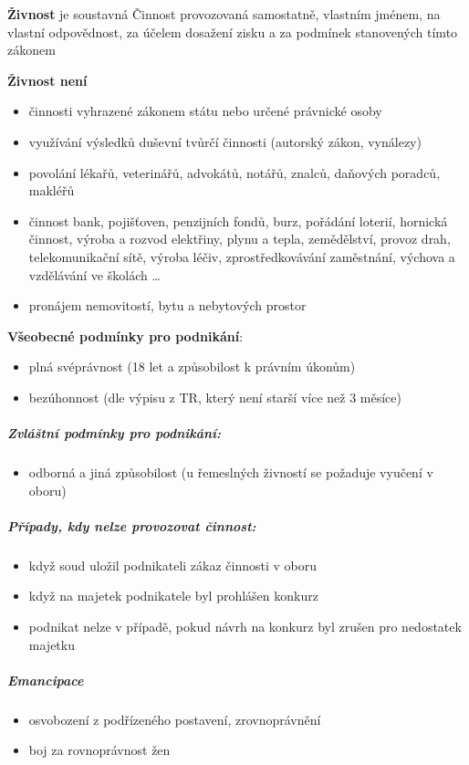 \documentclass[11pt,a4paper,twoside]{book}
\begin{document}
\textbf{Živnost} je soustavná Činnost provozovaná samostatně, vlastním jménem, na vlastní
odpovědnost, za účelem dosažení zisku a za podmínek stanovených tímto zákonem

\textbf{Živnost není}
\begin{itemize}
	\item činnosti vyhrazené zákonem státu nebo určené právnické osoby
	\item využívání výsledků duševní tvůrčí činnosti (autorský zákon, vynálezy)
	\item povolání lékařů, veterinářů, advokátů, notářů, znalců, daňových poradců, makléřů
	\item činnost bank, pojišťoven, penzijních fondů, burz, pořádání loterií, hornická činnost, výroba a rozvod elektřiny, plynu a tepla, zemědělství, provoz drah, telekomunikační sítě, výroba léčiv, zprostředkovávání zaměstnání, výchova a vzdělávání ve školách \ldots
	\item pronájem nemovitostí, bytu a nebytových prostor
\end{itemize}

\textbf{Všeobecné podmínky pro podnikání}:
\begin{itemize}
	\item plná svéprávnost (18 let a způsobilost k právním úkonům)
	\item bezúhonnost (dle výpisu z TR, který není starší více než 3 měsíce)
\end{itemize}

\subparagraph{Zvláštní podmínky pro podnikání:}
\begin{itemize}
	\item odborná a jiná způsobilost (u řemeslných živností se požaduje vyučení v oboru)
\end{itemize}

\subparagraph{Případy, kdy nelze provozovat činnost:}
\begin{itemize}
	\item když soud uložil podnikateli zákaz činnosti v oboru
	\item když na majetek podnikatele byl prohlášen konkurz
	\item podnikat nelze v případě, pokud návrh na konkurz byl zrušen pro nedostatek majetku
\end{itemize}

\subparagraph{Emancipace}
\begin{itemize}
	\item osvobození z podřízeného postavení, zrovnoprávnění
	\item boj za rovnoprávnost žen
\end{itemize}
\end{document}
